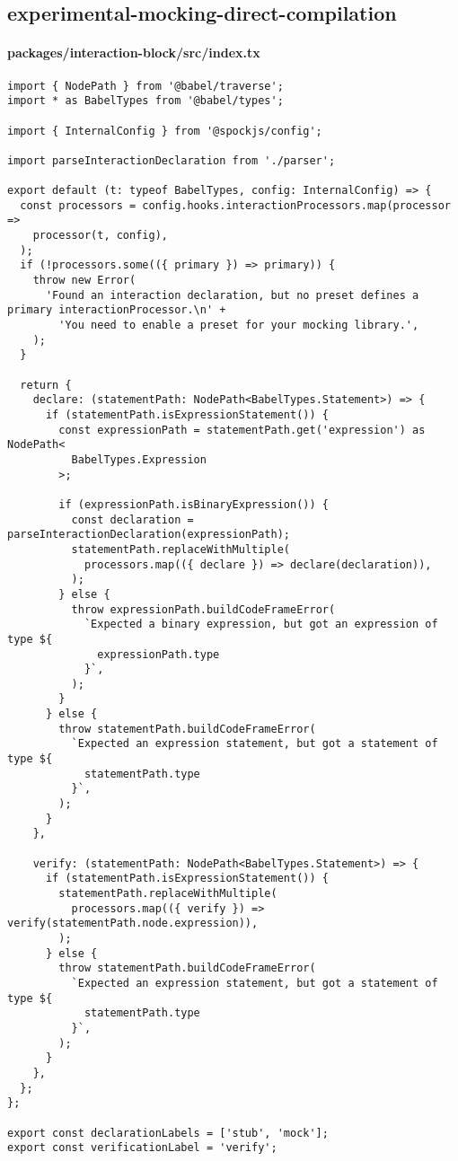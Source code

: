 \subsection*{experimental-mocking-direct-compilation}

\paragraph*{packages/interaction-block/src/index.tx}
\begin{verbatim}
import { NodePath } from '@babel/traverse';
import * as BabelTypes from '@babel/types';

import { InternalConfig } from '@spockjs/config';

import parseInteractionDeclaration from './parser';

export default (t: typeof BabelTypes, config: InternalConfig) => {
  const processors = config.hooks.interactionProcessors.map(processor =>
    processor(t, config),
  );
  if (!processors.some(({ primary }) => primary)) {
    throw new Error(
      'Found an interaction declaration, but no preset defines a primary interactionProcessor.\n' +
        'You need to enable a preset for your mocking library.',
    );
  }

  return {
    declare: (statementPath: NodePath<BabelTypes.Statement>) => {
      if (statementPath.isExpressionStatement()) {
        const expressionPath = statementPath.get('expression') as NodePath<
          BabelTypes.Expression
        >;

        if (expressionPath.isBinaryExpression()) {
          const declaration = parseInteractionDeclaration(expressionPath);
          statementPath.replaceWithMultiple(
            processors.map(({ declare }) => declare(declaration)),
          );
        } else {
          throw expressionPath.buildCodeFrameError(
            `Expected a binary expression, but got an expression of type ${
              expressionPath.type
            }`,
          );
        }
      } else {
        throw statementPath.buildCodeFrameError(
          `Expected an expression statement, but got a statement of type ${
            statementPath.type
          }`,
        );
      }
    },

    verify: (statementPath: NodePath<BabelTypes.Statement>) => {
      if (statementPath.isExpressionStatement()) {
        statementPath.replaceWithMultiple(
          processors.map(({ verify }) => verify(statementPath.node.expression)),
        );
      } else {
        throw statementPath.buildCodeFrameError(
          `Expected an expression statement, but got a statement of type ${
            statementPath.type
          }`,
        );
      }
    },
  };
};

export const declarationLabels = ['stub', 'mock'];
export const verificationLabel = 'verify';
\end{verbatim}

